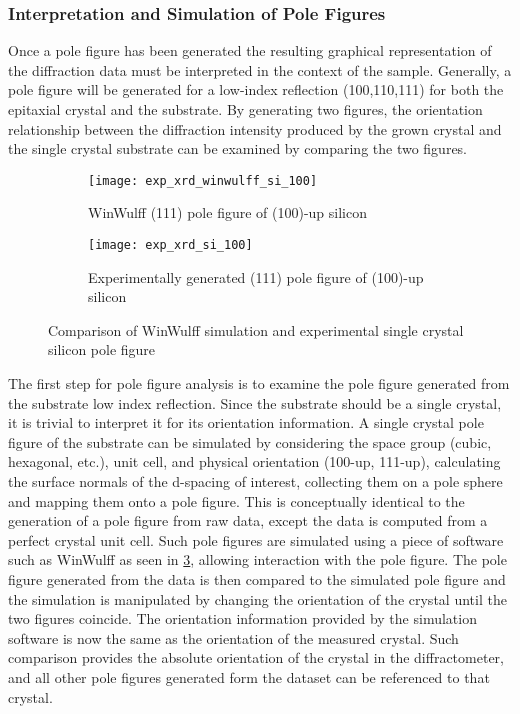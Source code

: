 \subsubsection{Interpretation and Simulation of Pole Figures} Once a pole figure has been generated the resulting graphical representation of the diffraction data must be interpreted in the context of the sample.
Generally, a pole figure will be generated for a low-index reflection (100,110,111) for both the epitaxial crystal and the substrate.
By generating two figures, the orientation relationship between the diffraction intensity produced by the grown crystal and the single crystal substrate can be examined by comparing the two figures.
\begin{figure}
 \centering \centering
 \begin{subfigure}[t]{0.55\textwidth}
  \centering \texttt{[image: exp\_xrd\_winwulff\_si\_100]}
  \caption{\label{fig:exp_xrd_winwulff_si_100}WinWulff (111) pole figure of (100)-up silicon}
 \end{subfigure}%
 \begin{subfigure}[t]{0.45\textwidth}
  \centering \texttt{[image: exp\_xrd\_si\_100]}
  \caption{\label{fig:exp_xrd_si_100}Experimentally generated (111) pole figure of (100)-up silicon}
 \end{subfigure}
 \caption{\label{fig:exp_xray_winwulff}Comparison of WinWulff simulation and experimental single crystal silicon pole figure}
\end{figure}

The first step for pole figure analysis is to examine the pole figure generated from the substrate low index reflection.
Since the substrate should be a single crystal, it is trivial to interpret it for its orientation information.
A single crystal pole figure of the substrate can be simulated by considering the space group (cubic, hexagonal, etc.), unit cell, and physical orientation (100-up, 111-up), calculating the surface normals of the d-spacing of interest, collecting them on a pole sphere and mapping them onto a pole figure.
This is conceptually identical to the generation of a pole figure from raw data, except the data is computed from a perfect crystal unit cell.
Such pole figures are simulated using a piece of software such as WinWulff\cite{Weber2006} as seen in \cref{fig:exp_xray_winwulff}, allowing interaction with the pole figure.
The pole figure generated from the data is then compared to the simulated pole figure and the simulation is manipulated by changing the orientation of the crystal until the two figures coincide.
The orientation information provided by the simulation software is now the same as the orientation of the measured crystal.
Such comparison provides the absolute orientation of the crystal in the diffractometer, and all other pole figures generated form the dataset can be referenced to that crystal.

